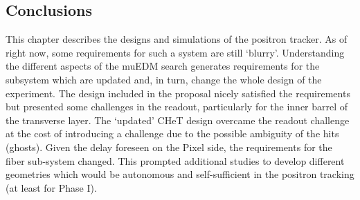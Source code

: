 \begin{refsection}
\section{Conclusions}
    This chapter describes the designs and simulations of the positron tracker.
    As of right now, some requirements for such a system are still `blurry'.
    Understanding the different aspects of the muEDM search generates requirements for the subsystem which are updated and, in turn, change the whole design of the experiment.
    The design included in the proposal nicely satisfied the requirements but presented some challenges in the readout, particularly for the inner barrel of the transverse layer.
    The `updated' CHeT design overcame the readout challenge at the cost of introducing a challenge due to the possible ambiguity of the hits (ghosts).
    Given the delay foreseen on the Pixel side, the requirements for the fiber sub-system changed.
    This prompted additional studies to develop different geometries which would be autonomous and self-sufficient in the positron tracking (at least for Phase I).
    
\printbibliography[
    heading = bibliographychapter,
    title=Bibliography on muEDM positron tracker
]

\end{refsection}